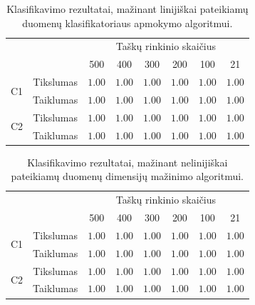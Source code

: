 \documentclass[]{vgtuef}
\begin{document}
\begin{table}
	\centering
	\caption{Klasifikavimo rezultatai, mažinant linijiškai pateikiamų duomenų klasifikatoriaus apmokymo algoritmui.}
	\label{table:second_phase_experiment}
	\begin{tabular}{|c|c|c|c|c|c|c|c|} \hline
			& & \multicolumn{6}{c|}{Taškų rinkinio skaičius} \\ \cline{3-8}
						&	& 500 	& 400	& 300 	& 200 & 100 	& 21 	\\ \hline
		\multirow{2}{*}{C1}
		& Tikslumas	& $1.00$ & $1.00$	& $1.00$ & $1.00$ & $1.00$ & $1.00$ \\ \cline{2-8}
		& Taiklumas  &	$1.00$ & $1.00$	& $1.00$ & $1.00$ & $1.00$ & $1.00$ \\ \hline
		\multirow{2}{*}{C2}
		& Tikslumas	& $1.00$ & $1.00$	& $1.00$ & $1.00$ & $1.00$ & $1.00$ \\ \cline{2-8}
		& Taiklumas  &	$1.00$ & $1.00$	& $1.00$ & $1.00$ & $1.00$ & $1.00$ \\ \hline
	\end{tabular}
\end{table}


\begin{table}
	\centering
	\caption{Klasifikavimo rezultatai, mažinant nelinijiškai pateikiamų duomenų dimensijų mažinimo algoritmui.}
	\label{table:second_phase_not_linear_experiment}
	\begin{tabular}{|c|c|c|c|c|c|c|c|} \hline
			& & \multicolumn{6}{c|}{Taškų rinkinio skaičius} \\ \cline{3-8}
						&	& 500 	& 400	& 300 	& 200 & 100 	& 21 	\\ \hline
		\multirow{2}{*}{C1}
		& Tikslumas	& $1.00$ & $1.00$	& $1.00$ & $1.00$ & $1.00$ & $1.00$ \\ \cline{2-8}
		& Taiklumas  &	$1.00$ & $1.00$	& $1.00$ & $1.00$ & $1.00$ & $1.00$ \\ \hline
		\multirow{2}{*}{C2}
		& Tikslumas	& $1.00$ & $1.00$	& $1.00$ & $1.00$ & $1.00$ & $1.00$ \\ \cline{2-8}
		& Taiklumas  &	$1.00$ & $1.00$	& $1.00$ & $1.00$ & $1.00$ & $1.00$ \\ \hline
	\end{tabular}
\end{table}
\end{document}
